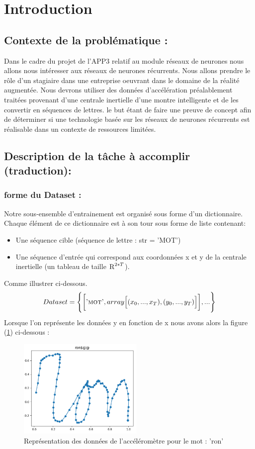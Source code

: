 \section{Introduction}
\subsection{Contexte de la problématique :}
Dans le cadre du projet de l'APP3 relatif au module réseaux de neurones nous allons nous intéresser aux réseaux de neurones récurrents. Nous allons prendre le rôle d'un stagiaire dans une entreprise oeuvrant dans le domaine de la réalité augmentée. Nous devrons utiliser des données d’accélération préalablement traitées provenant d’une centrale inertielle d’une montre intelligente et de les convertir en séquences de lettres. le but étant de faire une preuve de concept afin de déterminer si une technologie basée sur les réseaux de neurones récurrents est réalisable dans un contexte de ressources limitées.

\subsection{Description de la tâche à accomplir (traduction):}
\subsubsection{forme du Dataset :}
Notre sous-ensemble d'entrainement est organisé sous forme d'un dictionnaire. \\Chaque élément de ce dictionnaire est à son tour sous forme de liste contenant:
\begin{itemize}
    \item Une séquence cible (séquence de lettre : str = 'MOT')
    \item Une séquence d'entrée qui correspond aux coordonnées x et y de la centrale inertielle (un tableau de taille $\textsc{R}^{2*T}$).
\end{itemize}
Comme illustrer ci-dessous. 
$$
    Dataset = \Bigg\{\bigg[ \textsc{'mot'}, array \Big[(x_0,...,x_T), (y_0,...,y_T) \Big]\bigg],...\Bigg\}
$$
Lorsque l'on représente les données y en fonction de x nous avons alors la figure (\ref{fig:Figure 1  }) ci-dessous :
\begin{figure}[!h]
    \centering
    \includegraphics[width=60mm]{sections/inputSequence.PNG}
    \caption{Représentation des données de l'accéléromètre pour le mot : 'ron'}
    \label{fig:Figure 1  }
\end{figure}
